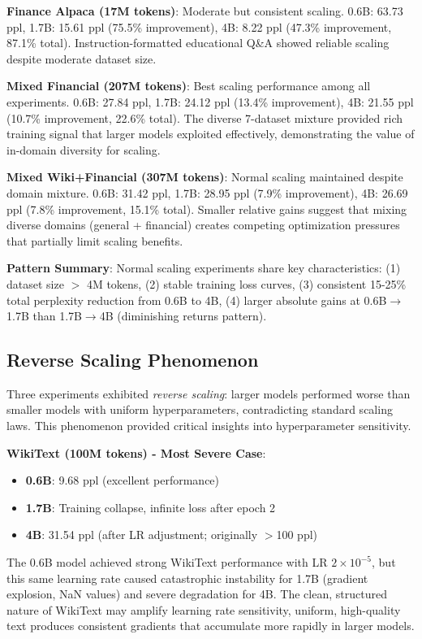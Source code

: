 \textbf{Finance Alpaca (17M tokens)}: Moderate but consistent scaling. 0.6B: 63.73 ppl, 1.7B: 15.61 ppl (75.5\% improvement), 4B: 8.22 ppl (47.3\% improvement, 87.1\% total). Instruction-formatted educational Q\&A showed reliable scaling despite moderate dataset size.

\textbf{Mixed Financial (207M tokens)}: Best scaling performance among all experiments. 0.6B: 27.84 ppl, 1.7B: 24.12 ppl (13.4\% improvement), 4B: 21.55 ppl (10.7\% improvement, 22.6\% total). The diverse 7-dataset mixture provided rich training signal that larger models exploited effectively, demonstrating the value of in-domain diversity for scaling.

\textbf{Mixed Wiki+Financial (307M tokens)}: Normal scaling maintained despite domain mixture. 0.6B: 31.42 ppl, 1.7B: 28.95 ppl (7.9\% improvement), 4B: 26.69 ppl (7.8\% improvement, 15.1\% total). Smaller relative gains suggest that mixing diverse domains (general + financial) creates competing optimization pressures that partially limit scaling benefits.

\textbf{Pattern Summary}: Normal scaling experiments share key characteristics: (1) dataset size $>$ 4M tokens, (2) stable training loss curves, (3) consistent 15-25\% total perplexity reduction from 0.6B to 4B, (4) larger absolute gains at 0.6B$\to$1.7B than 1.7B$\to$4B (diminishing returns pattern).

\subsection{Reverse Scaling Phenomenon}

Three experiments exhibited \textit{reverse scaling}: larger models performed worse than smaller models with uniform hyperparameters, contradicting standard scaling laws. This phenomenon provided critical insights into hyperparameter sensitivity.

\textbf{WikiText (100M tokens) - Most Severe Case}:
\begin{itemize}
\item \textbf{0.6B}: 9.68 ppl (excellent performance)
\item \textbf{1.7B}: Training collapse, infinite loss after epoch 2
\item \textbf{4B}: 31.54 ppl (after LR adjustment; originally $>$100 ppl)
\end{itemize}

The 0.6B model achieved strong WikiText performance with LR $2 \times 10^{-5}$, but this same learning rate caused catastrophic instability for 1.7B (gradient explosion, NaN values) and severe degradation for 4B. The clean, structured nature of WikiText may amplify learning rate sensitivity, uniform, high-quality text produces consistent gradients that accumulate more rapidly in larger models.

